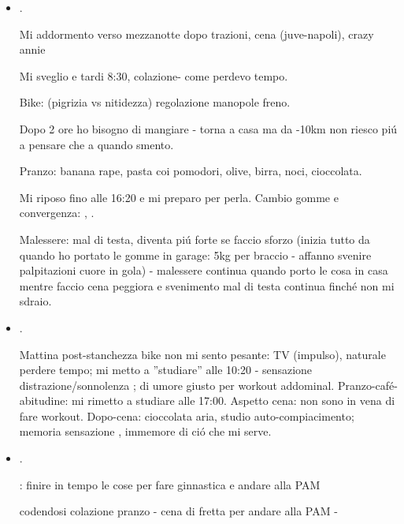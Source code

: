\begin{itemize}
A casa verso le 18: perdo tempo in lavoretti (as ).

Trazioni-cena e vado a letto.

\item {}.

Mi addormento verso mezzanotte dopo trazioni, cena (juve-napoli), crazy annie

Mi sveglio e  tardi 8:30, colazione-  come perdevo tempo.

Bike:  (pigrizia vs nitidezza) regolazione manopole freno.

Dopo 2 ore ho bisogno di mangiare - torna a casa ma da -10km non riesco pi\'u a pensare  che a quando smento.

Pranzo: banana rape, pasta coi pomodori, olive, birra, noci, cioccolata.

Mi riposo fino alle 16:20 e mi preparo per perla. Cambio gomme e convergenza: , .

Malessere: mal di testa, diventa pi\'u forte se faccio sforzo (inizia tutto da quando ho portato le gomme in garage: 5kg per braccio - affanno svenire palpitazioni cuore in gola) - malessere continua quando porto le cosa in casa mentre faccio cena peggiora e svenimento mal di testa continua finch\'e non mi sdraio.

\item {}.

Mattina post-stanchezza bike non mi sento pesante: TV (impulso), naturale perdere tempo; mi metto a ''studiare'' alle 10:20 - sensazione distrazione/sonnolenza ; di umore giusto per workout addominal. Pranzo-caf\'e-abitudine: mi rimetto a studiare alle 17:00. Aspetto cena: non sono in vena di fare workout. Dopo-cena: cioccolata aria, studio auto-compiacimento; memoria sensazione , immemore di ci\'o che mi serve.

\item {}.

: finire in tempo le cose per fare ginnastica e andare alla PAM

codendosi colazione pranzo - cena di fretta per andare alla PAM - 


\end{itemize}
